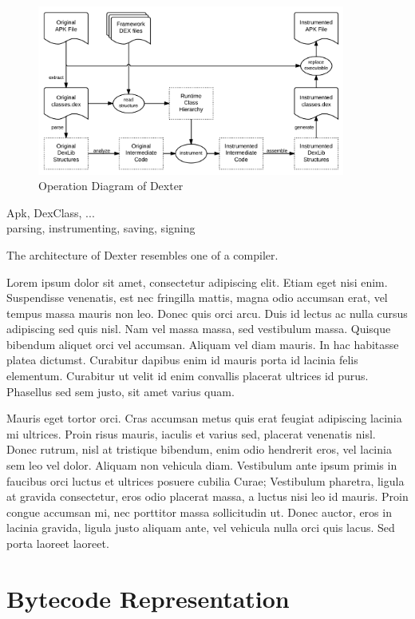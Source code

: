 \documentclass[12pt,twoside,notitlepage]{report}
\begin{document}
\begin{figure}
	\centerline{	
		\includegraphics[width=0.9\textwidth]{figs/fig_implementation_overview.png}
	}
	\caption{Operation Diagram of Dexter}
	\label{fig:Implementation_Overview}
\end{figure}

Apk, DexClass, ... \\
parsing, instrumenting, saving, signing

The architecture of Dexter resembles one of a compiler. 

Lorem ipsum dolor sit amet, consectetur adipiscing elit. Etiam eget nisi enim. Suspendisse venenatis, est nec fringilla mattis, magna odio accumsan erat, vel tempus massa mauris non leo. Donec quis orci arcu. Duis id lectus ac nulla cursus adipiscing sed quis nisl. Nam vel massa massa, sed vestibulum massa. Quisque bibendum aliquet orci vel accumsan. Aliquam vel diam mauris. In hac habitasse platea dictumst. Curabitur dapibus enim id mauris porta id lacinia felis elementum. Curabitur ut velit id enim convallis placerat ultrices id purus. Phasellus sed sem justo, sit amet varius quam.

Mauris eget tortor orci. Cras accumsan metus quis erat feugiat adipiscing lacinia mi ultrices. Proin risus mauris, iaculis et varius sed, placerat venenatis nisl. Donec rutrum, nisl at tristique bibendum, enim odio hendrerit eros, vel lacinia sem leo vel dolor. Aliquam non vehicula diam. Vestibulum ante ipsum primis in faucibus orci luctus et ultrices posuere cubilia Curae; Vestibulum pharetra, ligula at gravida consectetur, eros odio placerat massa, a luctus nisi leo id mauris. Proin congue accumsan mi, nec porttitor massa sollicitudin ut. Donec auctor, eros in lacinia gravida, ligula justo aliquam ante, vel vehicula nulla orci quis lacus. Sed porta laoreet laoreet.

\section{Bytecode Representation}
\end{document}

